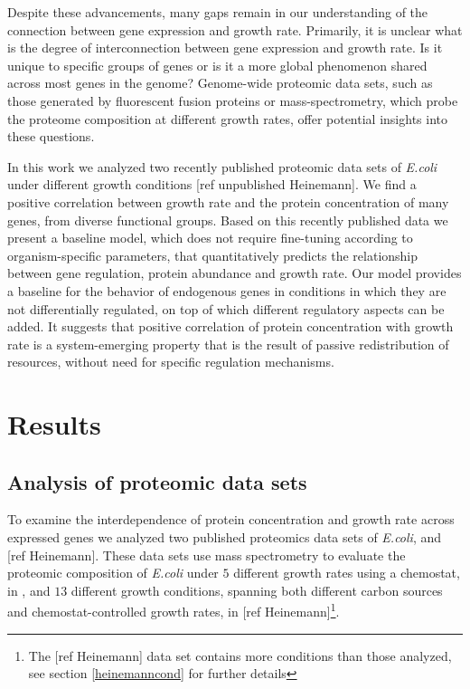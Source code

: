 \documentclass[notitlepage]{article}
\begin{document}
Despite these advancements, many gaps remain in our understanding of the connection between gene expression and growth rate.
Primarily, it is unclear what is the degree of interconnection between gene expression and growth rate.
Is it unique to specific groups of genes or is it a more global phenomenon shared across most genes in the genome?
Genome-wide proteomic data sets, such as those generated by fluorescent fusion proteins or mass-spectrometry, which probe the proteome composition at different growth rates, offer potential insights into these questions.

In this work we analyzed two recently published proteomic data sets of \emph{E.coli} under different growth conditions \parencite{Valgepea2013} [ref unpublished Heinemann].
We find a positive correlation between growth rate and the protein concentration of many genes, from diverse functional groups.
Based on this recently published data we present a baseline model, which does not require fine-tuning according to organism-specific parameters, that quantitatively predicts the relationship between gene regulation, protein abundance and growth rate.
Our model provides a baseline for the behavior of endogenous genes in conditions in which they are not differentially regulated, on top of which different regulatory aspects can be added.
It suggests that positive correlation of protein concentration with growth rate is a system-emerging property that is the result of passive redistribution of resources, without need for specific regulation mechanisms.

\section{Results}
\subsection{Analysis of proteomic data sets}
To examine the interdependence of protein concentration and growth rate across expressed genes we analyzed two published proteomics data sets of \emph{E.coli}, \parencite{Valgepea2013} and [ref Heinemann].
These data sets use mass spectrometry to evaluate the proteomic composition of \emph{E.coli} under $5$ different growth rates using a chemostat, in \parencite{Valgepea2013}, and $13$ different growth conditions, spanning both different carbon sources and chemostat-controlled growth rates, in [ref Heinemann]\footnote{The [ref Heinemann] data set contains more conditions than those analyzed, see section \ref{heinemanncond} for further details}.
\end{document}
